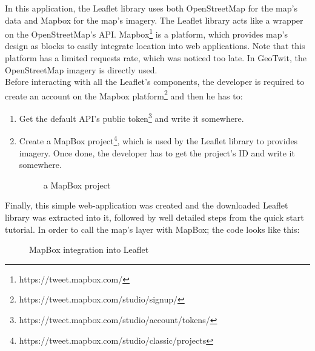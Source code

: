 \documentclass[a4paper,11pt]{report}
\begin{document}
In this application, the Leaflet library uses both OpenStreetMap for the map's data and Mapbox for the map's imagery. The Leaflet library acts like a wrapper on the OpenStreetMap's API. Mapbox\footnote{https://tweet.mapbox.com/} is a platform, which provides map's design as blocks to easily integrate location into web applications. Note that this platform has a limited requests rate, which was noticed too late. In GeoTwit, the OpenStreetMap imagery is directly used.\\

Before interacting with all the Leaflet's components, the developer is required to create an account on the Mapbox platform\footnote{https://tweet.mapbox.com/studio/signup/} and then he has to:
\begin{enumerate}
	\item Get the default API's public token\footnote{https://tweet.mapbox.com/studio/account/tokens/} and write it somewhere.
	\item Create a MapBox project\footnote{https://tweet.mapbox.com/studio/classic/projects}, which is used by the Leaflet library to provides imagery. Once done, the developer has to get the project's ID and write it somewhere.
	\begin{figure}[H]
	\vspace{-5pt}
	\begin{center}
	\vspace{-5pt}
	\caption{a MapBox project}
	\end{center}
	\end{figure}
	\vspace{-20pt}
\end{enumerate}
	
Finally, this simple web-application was created and the downloaded Leaflet library was extracted into it, followed by well detailed steps from the quick start tutorial. In order to call the map's layer with MapBox; the code looks like this:
\begin{figure}[H]
\vspace{-5pt}
\begin{center}
\vspace{-20pt}
\caption{MapBox integration into Leaflet}
\end{center}
\end{figure}
\end{document}
